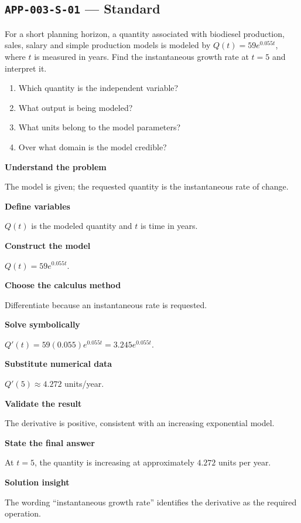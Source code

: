 \documentclass[11pt]{book}
\newcommand{\pid}[1]{\texttt{#1}}
\begin{document}
\subsection*{\pid{APP-003-S-01} — Standard}
\begin{problembox}
For a short planning horizon, a quantity associated with biodiesel production, sales, salary and simple production models is modeled by $Q(t)=59e^{0.055t}$, where $t$ is measured in years. Find the instantaneous growth rate at $t=5$ and interpret it.
\end{problembox}
\begin{promptbox}\begin{enumerate}
\item Which quantity is the independent variable?
\item What output is being modeled?
\item What units belong to the model parameters?
\item Over what domain is the model credible?
\end{enumerate}\end{promptbox}
\begin{solutionbox}
\textbf{Understand the problem}\par The model is given; the requested quantity is the instantaneous rate of change.\par\medskip
\textbf{Define variables}\par $Q(t)$ is the modeled quantity and $t$ is time in years.\par\medskip
\textbf{Construct the model}\par $Q(t)=59e^{0.055t}$.\par\medskip
\textbf{Choose the calculus method}\par Differentiate because an instantaneous rate is requested.\par\medskip
\textbf{Solve symbolically}\par $Q'(t)=59(0.055)e^{0.055t}=3.245e^{0.055t}$.\par\medskip
\textbf{Substitute numerical data}\par $Q'(5)\approx 4.272$ units/year.\par\medskip
\textbf{Validate the result}\par The derivative is positive, consistent with an increasing exponential model.\par\medskip
\textbf{State the final answer}\par At $t=5$, the quantity is increasing at approximately $4.272$ units per year.\par\medskip
\textbf{Solution insight}\par The wording “instantaneous growth rate” identifies the derivative as the required operation.\par\medskip
\end{solutionbox}
\end{document}
